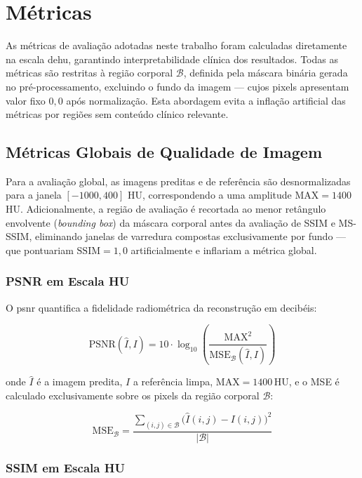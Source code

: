
\section{Métricas}

As métricas de avaliação adotadas neste trabalho foram calculadas diretamente na escala de\acrfull{hu}, garantindo interpretabilidade clínica dos resultados. Todas as métricas são restritas à região corporal $\mathcal{B}$, definida pela máscara binária gerada no pré-processamento, excluindo o fundo da imagem — cujos pixels apresentam valor fixo $0{,}0$ após normalização. Esta abordagem evita a inflação artificial das métricas por regiões sem conteúdo clínico relevante.

\subsection{Métricas Globais de Qualidade de Imagem}

Para a avaliação global, as imagens preditas e de referência são desnormalizadas para a janela $[-1000, 400]$ HU, correspondendo a uma amplitude $\mathrm{MAX} = 1400$ HU. Adicionalmente, a região de avaliação é recortada ao menor retângulo envolvente (\textit{bounding box}) da máscara corporal antes da avaliação de SSIM e MS-SSIM, eliminando janelas de varredura compostas exclusivamente por fundo — que pontuariam $\text{SSIM} = 1{,}0$ artificialmente e inflariam a métrica global.

\subsubsection{PSNR em Escala HU}

O \acrfull{psnr} quantifica a fidelidade radiométrica da reconstrução em decibéis:

\[
\text{PSNR}(\hat{I}, I) = 10 \cdot \log_{10}\!\left(\frac{\mathrm{MAX}^2}{\mathrm{MSE}_{\mathcal{B}}(\hat{I}, I)}\right)
\]

\noindent onde $\hat{I}$ é a imagem predita, $I$ a referência limpa, $\mathrm{MAX} = 1400\,\text{HU}$, e o MSE é calculado exclusivamente sobre os pixels da região corporal $\mathcal{B}$:

\[
\mathrm{MSE}_{\mathcal{B}} = \frac{\displaystyle\sum_{(i,j)\in\mathcal{B}} \bigl(\hat{I}(i,j) - I(i,j)\bigr)^2}{|\mathcal{B}|}
\]

\subsubsection{SSIM em Escala HU}

